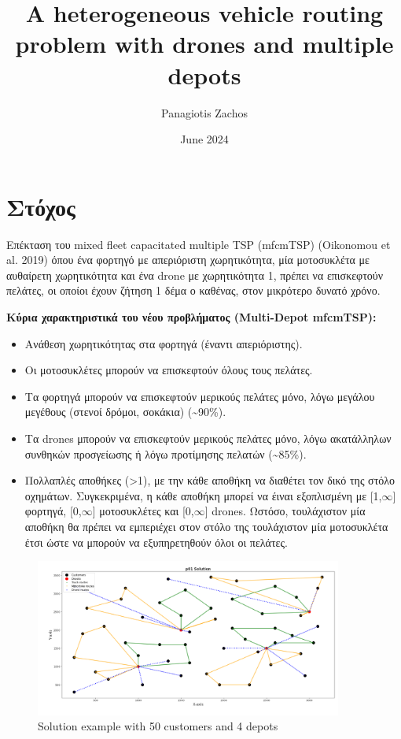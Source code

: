 \documentclass{article}
\title{A heterogeneous vehicle routing problem with drones and multiple depots}
\author{Panagiotis Zachos}
\date{June 2024}
\begin{document}
	\maketitle
	\section{Στόχος}
	Επέκταση του mixed fleet capacitated multiple TSP (mfcmTSP) (Oikonomou et al. 2019)  όπου ένα φορτηγό με απεριόριστη χωρητικότητα, μία μοτοσυκλέτα με αυθαίρετη χωρητικότητα και ένα drone με χωρητικότητα 1, πρέπει να επισκεφτούν πελάτες, οι οποίοι έχουν ζήτηση 1 δέμα ο καθένας, στον μικρότερο δυνατό χρόνο.\;
	\newline
	\par
	
	\textbf{Κύρια χαρακτηριστικά του νέου προβλήματος (Multi-Depot mfcmTSP):}
	\begin{itemize}
		\item {}Ανάθεση χωρητικότητας στα φορτηγά (έναντι απεριόριστης).\;
		\item {}Οι μοτοσυκλέτες μπορούν να επισκεφτούν όλους τους πελάτες.\; 
		\item Τα φορτηγά μπορούν να επισκεφτούν μερικούς πελάτες μόνο, λόγω μεγάλου μεγέθους (στενοί δρόμοι, σοκάκια) (\textasciitilde 90\%).\;
		\item {}Τα drones μπορούν να επισκεφτούν μερικούς πελάτες μόνο, λόγω ακατάλληλων συνθηκών προσγείωσης ή λόγω προτίμησης πελατών (\textasciitilde 85\%).
		\item {}Πολλαπλές αποθήκες (>1), με την κάθε αποθήκη να διαθέτει τον δικό της στόλο οχημάτων.\;
		Συγκεκριμένα, η κάθε αποθήκη μπορεί να έιναι εξοπλισμένη με [1,$\infty$] φορτηγά, [0,$\infty$] μοτοσυκλέτες και [0,$\infty$] drones. Ωστόσο, τουλάχιστον μία αποθήκη θα πρέπει να εμπεριέχει στον στόλο της τουλάχιστον μία μοτοσυκλέτα έτσι ώστε να μπορούν να εξυπηρετηθούν όλοι οι πελάτες.\;
	\end{itemize}
	\par
	\begin{figure}[h]
		\caption{Solution example with 50 customers and 4 depots}
		\centering
		\includegraphics[width=0.9\textwidth]{p01_best_solution}
	\end{figure}
\end{document}

